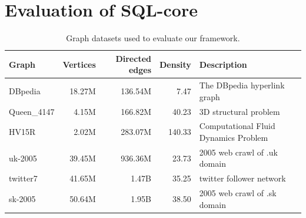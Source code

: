 \documentclass{sokendai_thesis} %
\begin{document}

\section{Evaluation of SQL-core}

\begin{table}[t]
\centering
\caption{Graph datasets used to evaluate our framework.}
\vspace{-5pt}
\label{tab:datasets}
\begin{tabular}{lrrrl}
\hline
Graph & Vertices & Directed edges & Density & Description \\
\hline
DBpedia & 18.27M & 136.54M & 7.47 & The DBpedia hyperlink graph~\cite{konect} \\
Queen\_4147 & 4.15M & 166.82M & 40.23 & 3D structural problem~\cite{davis2011university} \\
HV15R & 2.02M & 283.07M & 140.33 & Computational Fluid Dynamics Problem~\cite{davis2011university} \\
uk-2005 & 39.45M & 936.36M & 23.73 & 2005 web crawl of .uk domain~\cite{davis2011university} \\
twitter7 & 41.65M & 1.47B & 35.25 & twitter follower network~\cite{davis2011university} \\
sk-2005 & 50.64M & 1.95B & 38.50 & 2005 web crawl of .sk domain~\cite{davis2011university} \\
\hline
\end{tabular}
\end{table}
\end{document}

